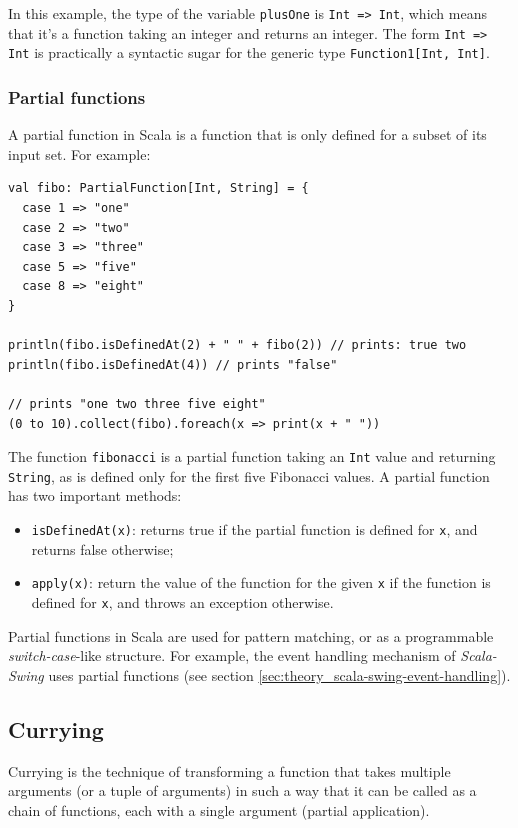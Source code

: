 In this example, the type of the variable \texttt{plusOne} is \texttt{Int => Int}, which means that it's a function taking an integer and returns an integer. The form \texttt{Int => Int} is practically a syntactic sugar for the generic type \texttt{Function1[Int, Int]}.

\subsubsection{Partial functions}

A partial function in Scala is a function that is only defined for a subset of its input set. For example:
\begin{lstlisting}
val fibo: PartialFunction[Int, String] = {
  case 1 => "one"
  case 2 => "two"
  case 3 => "three"
  case 5 => "five"
  case 8 => "eight"
}

println(fibo.isDefinedAt(2) + " " + fibo(2)) // prints: true two
println(fibo.isDefinedAt(4)) // prints "false"

// prints "one two three five eight"
(0 to 10).collect(fibo).foreach(x => print(x + " "))
\end{lstlisting}

The function \texttt{fibonacci} is a partial function taking an \texttt{Int} value and returning \texttt{String}, as is defined only for the first five Fibonacci values. A partial function has two important methods: 
\begin{itemize}
\item \texttt{isDefinedAt(x)}: returns true if the partial function is defined for \texttt{x}, and returns false otherwise;
\item \texttt{apply(x)}: return the value of the function for the given \texttt{x} if the function is defined for \texttt{x}, and throws an exception otherwise.
\end{itemize}

Partial functions in Scala are used for pattern matching, or as a programmable \emph{switch-case}-like structure. For example, the event handling mechanism of \emph{Scala-Swing} uses partial functions (see section \ref{sec:theory_scala-swing-event-handling}).

\subsection{Currying}

Currying is the technique of transforming a function that takes multiple arguments (or a tuple of arguments) in such a way that it can be called as a chain of functions, each with a single argument (partial application).

